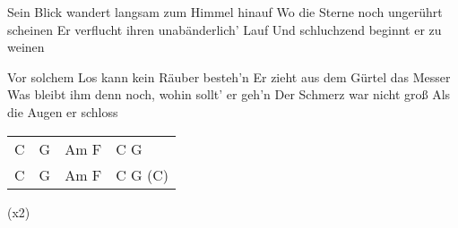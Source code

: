 \begin{guitar}
	Sein Blick wandert langsam zum Himmel hinauf
	Wo die Sterne noch ungerührt scheinen
	Er verflucht ihren unabänderlich' Lauf
	Und schluchzend beginnt er zu weinen
	
	Vor solchem Los kann kein Räuber besteh'n
	Er zieht aus dem Gürtel das Messer
	Was bleibt ihm denn noch, wohin sollt' er geh'n
	Der Schmerz war nicht groß
	Als die Augen er schloss

	 {\footnotesize\begin{tabular}{l|l|l|l}
			C & G & Am F & C G \\
			C & G & Am F & C G (C) 
	\end{tabular}}

	  (x2)	
\end{guitar}
